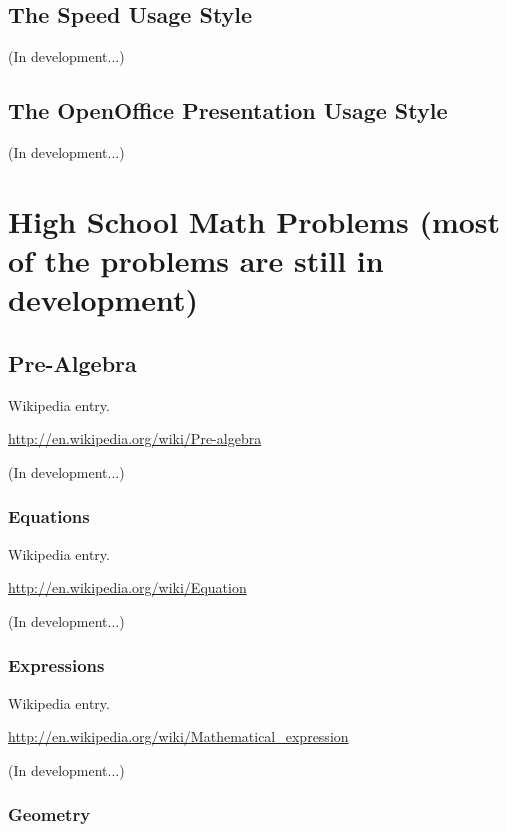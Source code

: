 \documentclass[12pt,oneside]{book}
\begin{document}
\section[The Speed Usage Style]{The Speed Usage Style} (In development...)

\section[The OpenOffice Presentation Usage Style]{The OpenOffice Presentation Usage Style}

(In development...)
\chapter[High School Math Problems]{High School Math Problems (most of the problems are still in development)}

\section[Pre{}-Algebra]{Pre{}-Algebra}

Wikipedia entry.

\href{http://en.wikipedia.org/wiki/Pre-algebra}{http://en.wikipedia.org/wiki/Pre{}-algebra}

(In development...)

\subsection[Equations]{Equations}

Wikipedia entry.

\href{http://en.wikipedia.org/wiki/Equation}{http://en.wikipedia.org/wiki/Equation}

(In development...)

\subsection[Expressions]{Expressions}

Wikipedia entry.

\href{http://en.wikipedia.org/wiki/Mathematical_expression}{http://en.wikipedia.org/wiki/Mathematical\_expression}

(In development...)

\subsection[Geometry]{Geometry}
\end{document}
